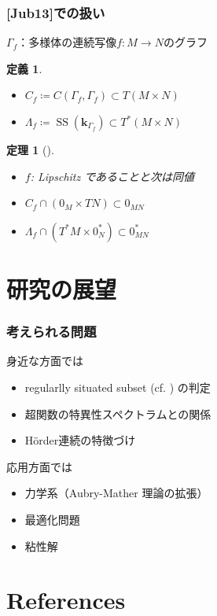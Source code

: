 \documentclass[dvipdfmx,12pt,aspectratio=169,leqno]{beamer}%
\newcommand{\kk}{\mathbf{k}}
\numberwithin{equation}{subsection}
\newcommand{\muS}{\mathop{\mathrm{SS}}\nolimits}
\theoremstyle{mystyle}
\newtheorem{DFN}[AXM]{定義}
\newtheorem{THM}[AXM]{定理}
\begin{document}
\begin{frame}
    \frametitle{[Jub13]での扱い}
    \(\Gamma_{f}\)：多様体の連続写像\(f\colon M\to N\)のグラフ
    \begin{DFN}
    \begin{itemize}
        \item \(C_f\coloneqq C(\Gamma_f,\Gamma_f)\subset T(M\times N)\)
        \item \(\Lambda_f\coloneqq \muS(\kk_{\Gamma_{f}})\subset T^{\ast}(M\times N)\)
    \end{itemize}
    \end{DFN}
    \begin{THM}[{\cite{Jub13}}]
        \begin{itemize}
            \item \(f\): Lipschitz であることと次は同値
            \item \(C_f\cap (0_M\times TN)\subset 0_{MN}\)
            \item \(\Lambda_f\cap (T^{\ast} M\times 0_{N}^{\ast})\subset 0^{\ast}_{MN}\)
        \end{itemize}
    \end{THM}
\end{frame}

\section{研究の展望}
\begin{frame}
    \frametitle{考えられる問題}
    身近な方面では
    \begin{itemize}
        \item regularlly situated subset (cf. \cite{GS16}) の判定
        \item 超関数の特異性スペクトラムとの関係
        \item H\"order連続の特徴づけ
    \end{itemize}
    応用方面では
    \begin{itemize}
        \item 力学系（Aubry-Mather 理論の拡張）
        \item 最適化問題
        \item 粘性解
    \end{itemize}
\end{frame}


\section{References}
\end{document}
